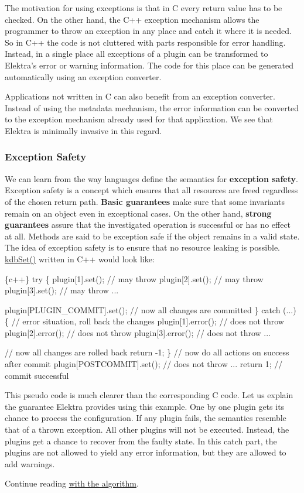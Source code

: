 The motivation for using exceptions is that in C every return value has to be checked. On the other hand, the C++ exception mechanism allows the programmer to throw an exception in any place and catch it where it is needed. So in C++ the code is not cluttered with parts responsible for error handling. Instead, in a single place all exceptions of a plugin can be transformed to Elektra’s error or warning information. The code for this place can be generated automatically using an exception converter.

Applications not written in C can also benefit from an exception converter. Instead of using the metadata mechanism, the error information can be converted to the exception mechanism already used for that application. We see that Elektra is minimally invasive in this regard.

\subsubsection*{Exception Safety}

We can learn from the way languages define the semantics for {\bfseries exception safety}. Exception safety is a concept which ensures that all resources are freed regardless of the chosen return path. {\bfseries Basic guarantees} make sure that some invariants remain on an object even in exceptional cases. On the other hand, {\bfseries strong guarantees} assure that the investigated operation is successful or has no effect at all. Methods are said to be exception safe if the object remains in a valid state. The idea of exception safety is to ensure that no resource leaking is possible. {\ttfamily \hyperlink{group__kdb_ga11436b058408f83d303ca5e996832bcf}{kdb\+Set()}} written in C++ would look like\+:


\begin{DoxyCode}
\{c++\}
try \{
        plugin[1].set(); // may throw
        plugin[2].set(); // may throw
        plugin[3].set(); // may throw
        ...

        plugin[PLUGIN\_COMMIT].set(); // now all changes are committed
\} catch (...) \{
        // error situation, roll back the changes
        plugin[1].error(); // does not throw
        plugin[2].error(); // does not throw
        plugin[3].error(); // does not throw
        ...

        // now all changes are rolled back
        return -1;
\} // now do all actions on success after commit
plugin[POSTCOMMIT].set(); // does not throw
...
return 1; // commit successful
\end{DoxyCode}


This pseudo code is much clearer than the corresponding C code. Let us explain the guarantee Elektra provides using this example. One by one plugin gets its chance to process the configuration. If any plugin fails, the semantics resemble that of a thrown exception. All other plugins will not be executed. Instead, the plugins get a chance to recover from the faulty state. In this catch part, the plugins are not allowed to yield any error information, but they are allowed to add warnings.

Continue reading \hyperlink{doc_dev_algorithm_md}{with the algorithm}. 